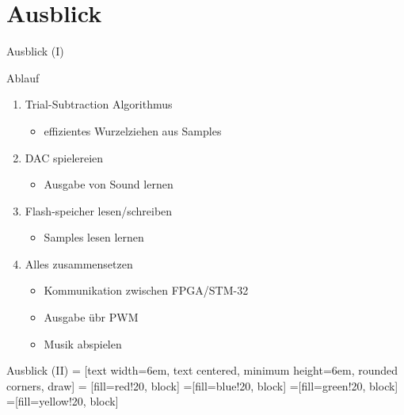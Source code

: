 \section{Ausblick}
\begin{frame} {Ausblick (I)}
  \begin{block} {Ablauf}
    \begin{enumerate}
      \item Trial-Subtraction Algorithmus
            \begin{itemize}
              \item effizientes Wurzelziehen aus Samples
            \end{itemize}
      \item DAC spielereien
            \begin{itemize}
              \item Ausgabe von Sound lernen
            \end{itemize}
      \item Flash-speicher lesen/schreiben
            \begin{itemize}
              \item Samples lesen lernen
            \end{itemize}
      \item Alles zusammensetzen
            \begin{itemize}
              \item Kommunikation zwischen FPGA/STM-32
              \item Ausgabe übr PWM
              \item Musik abspielen
            \end{itemize}
    \end{enumerate}
  \end{block}
\end{frame}

\begin{frame} {Ausblick (II)}
   = [text width=6em, text centered, minimum height=6em, 
  rounded corners, draw]
   = [fill=red!20, block]
  =[fill=blue!20, block]
  =[fill=green!20, block]
  =[fill=yellow!20, block]
  \begin{center}
  \end{center}
\end{frame}

